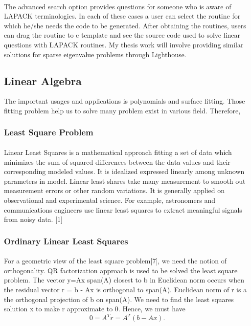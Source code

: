 \documentclass[pdftex,12pt,a4paper]{article}
\begin{document}
\paragraph{}				
The advanced search option provides questions for someone who is aware of LAPACK terminologies. In each of these cases a user can select the routine for which he/she needs the code to be generated. After obtaining the routines, users can drag the routine to c template and see the source code used to solve linear questions with LAPACK routines. My thesis work will involve providing similar solutions for sparse eigenvalue problems through Lighthouse.
\subsection{Linear Algebra}
The important usages and applications is polynomials and surface fitting. Those fitting problem help us to solve many  problem exist in various field. Therefore, 
\subsubsection{Least Square Problem}
\paragraph{}
Linear Least Squares is a mathematical approach fitting a set of data which minimizes the sum of squared differences between the data values and their corresponding modeled values. It is idealized expressed linearly among unknown parameters in model. Linear least shares take many measurement to smooth out measurement errors or other random variations. It is generally applied on observational and experimental science. For example, astronomers and communications engineers use linear least squares to extract meaningful signals from noisy data. [1]
\subsubsection{Ordinary Linear Least Squares}
\paragraph{}
       For a geometric view of the least square problem[7], we need the notion of orthogonality. QR factorization approach is used to be solved the least square problem. The vector y=Ax span(A) closest to b in Euclidean norm occurs when the residual vector r = b - Ax is orthogonal to span(A). Euclidean norm of r is a the orthogonal projection of b on span(A). We need to find the least squares solution x to make r approximate to 0. Hence, we must have 
\begin{equation}
       0=A^{T}r=A^{T}(b-Ax).
 \end{equation}
\end{document}
